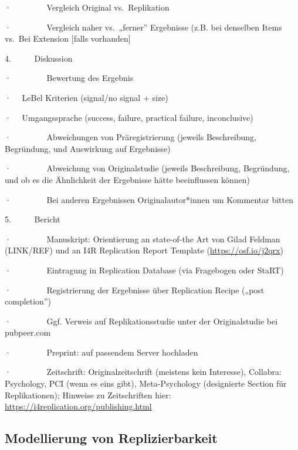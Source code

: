 \documentclass[
  letterpaper,
  DIV=11,
  numbers=noendperiod]{scrreprt}
\begin{document}
·~~~~~~~~ Vergleich Original vs.~Replikation

·~~~~~~~~ Vergleich naher vs.~„ferner'' Ergebnisse (z.B. bei denselben
Items vs.~Bei Extension {[}falls vorhanden{]}

4.~~~~~ Diskussion

·~~~~~~~~ Bewertung des Ergebnis

·~~ LeBel Kriterien (signal/no signal + size)

·~~ Umgangssprache (success, failure, practical failure, inconclusive)

·~~~~~~~~ Abweichungen von Präregistrierung (jeweils Beschreibung,
Begründung, und Auswirkung auf Ergebnisse)

·~~~~~~~~ Abweichung von Originalstudie (jeweils Beschreibung,
Begründung, und ob es die Ähnlichkeit der Ergebnisse hätte beeinflussen
können)

·~~~~~~~~ Bei anderen Ergebnissen Originalautor*innen um Kommentar
bitten

5.~~~~~ Bericht

·~~~~~~~~ Manuskript: Orientierung an state-of-the Art von Gilad Feldman
(LINK/REF) und an I4R Replication Report Template
(\url{https://osf.io/j2qrx})

·~~~~~~~~ Eintragung in Replication Database (via Fragebogen oder StaRT)

·~~~~~~~~ Registrierung der Ergebnisse über Replication Recipe („post
completion'')

·~~~~~~~~ Ggf. Verweis auf Replikationsstudie unter der Originalstudie
bei pubpeer.com

·~~~~~~~~ Preprint: auf passendem Server hochladen

·~~~~~~~~ Zeitschrift: Originalzeitschrift (meistens kein Interesse),
Collabra: Psychology, PCI (wenn es eins gibt), Meta-Psychology
(designierte Section für Replikationen); Hinweise zu Zeitschriften hier:
\url{https://i4replication.org/publishing.html}

\subsection{Modellierung von
Replizierbarkeit}\label{modellierung-von-replizierbarkeit}
\end{document}
